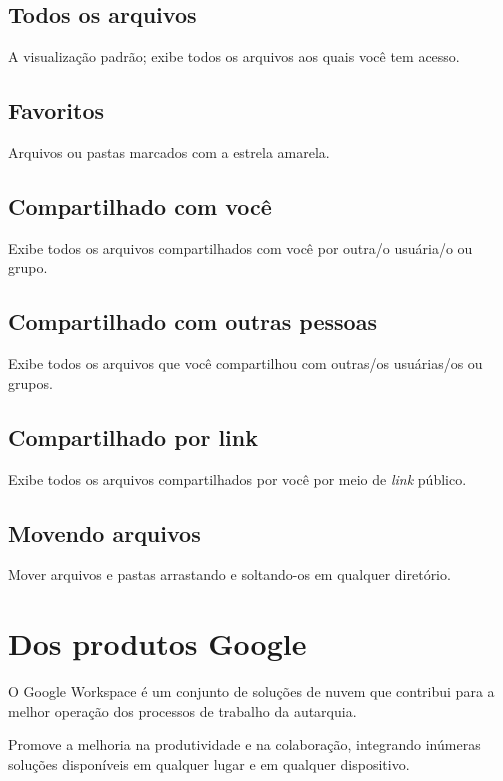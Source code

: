\documentclass[openright, twoside, a4paper]{memoir}
\begin{document}
\section{Todos os arquivos}

A visualização padrão; exibe todos os arquivos aos quais você tem
acesso.

\section{Favoritos}

Arquivos ou pastas marcados com a estrela amarela.

\section{Compartilhado com você}

Exibe todos os arquivos compartilhados com você por outra/o usuária/o ou
grupo.

\section{Compartilhado com outras
pessoas}

Exibe todos os arquivos que você compartilhou com outras/os usuárias/os
ou grupos.

\section{Compartilhado por link}

Exibe todos os arquivos compartilhados por você por meio de \emph{link}
público.

\section{Movendo arquivos}

Mover arquivos e pastas arrastando e soltando-os em qualquer diretório.

\clearpage\chapter{Dos produtos Google}

O Google Workspace é um conjunto de soluções de nuvem que contribui para
a melhor operação dos processos de trabalho da autarquia.

Promove a melhoria na produtividade e na colaboração, integrando
inúmeras soluções disponíveis em qualquer lugar e em qualquer
dispositivo.
\end{document}

